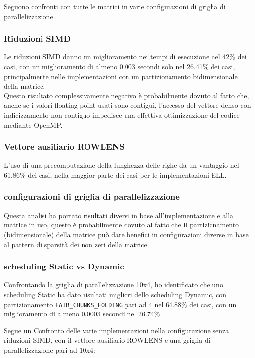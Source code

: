 \documentclass[acmsmall,nonacm=true]{acmart}
\newcommand{\vvv}[1]{{\small\texttt{#1}}}
\begin{document}
Seguono confronti con tutte le matrici in varie configurazioni di griglia di parallelizzazione
\subsubsection{Riduzioni SIMD}
Le riduzioni SIMD danno un miglioramento nei tempi di esecuzione nel 42\% dei casi, con un miglioramento
di almeno 0.003 secondi solo nel 26.41\% dei casi, principalmente nelle implementazioni con un 
partizionamento bidimensionale della matrice.\\
Questo risultato complessivamente negativo è probabilmente 
dovuto al fatto che, anche se i valori floating point usati sono contigui,
l'accesso del vettore denso con indicizzamento non contiguo impedisce una effettiva ottimizzazione 
del codice mediante OpenMP.\\
\subsubsection{Vettore ausiliario ROWLENS}
L'uso di una precomputazione della lunghezza delle righe da un vantaggio nel 61.86\% dei casi, nella 
maggior parte dei casi per le implementazioni ELL.


\subsubsection{configurazioni di griglia di parallelizzazione}
Questa analisi ha portato risultati diversi in base all'implementazione e alla matrice in uso,
questo è probabilmente dovuto al fatto che il partizionamento (bidimensionale) della matrice 
può dare benefici in configurazioni diverse in base al pattern di sparsità dei non zeri della matrice.

\subsubsection{scheduling Static vs Dynamic}
Confrontando la griglia di parallelizzazione 10x4, ho identificato che uno scheduling Static
ha dato risultati migliori dello scheduling Dynamic, con partizionamento \vvv{FAIR\_CHUNKS\_FOLDING} pari ad 4
 nel 64.88\% dei casi, con un miglioramento di almeno 0.0003 secondi nel 26.74\%

Segue un Confronto delle varie implementazioni nella configurazione senza riduzioni SIMD, con il vettore ausiliario
ROWLENS e una griglia di parallelizzazione pari ad 10x4: %
\end{document}
